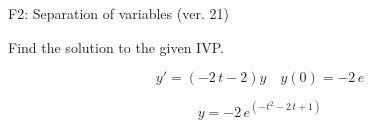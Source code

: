 \begin{exercise}
  \begin{exerciseTitle}F2: Separation of variables (ver. 21)\end{exerciseTitle}
  \begin{exerciseStatement}
    
Find the solution to the given IVP.

    
\[y'=( -2 \, t - 2 )y\hspace{1em} y(0)= -2 \, e\]

  \end{exerciseStatement}
  \begin{exerciseAnswer}
    
\[y= -2 \, e^{\left(-t^{2} - 2 \, t + 1\right)}\]

  \end{exerciseAnswer}
\end{exercise}